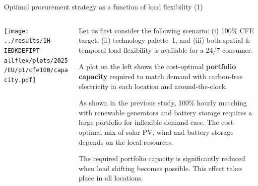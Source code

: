 \begin{frame}{Optimal procurement strategy as a function of load flexibility (1)}

  {\footnotesize
  \vspace{0.2cm}
  
  \begin{columns}[T]
  \begin{column}{9cm}
  \centering
  
  \texttt{[image: ../results/1H-IEDKDEFIPT-allflex/plots/2025/EU/p1/cfe100/capacity.pdf]}
  \end{column}
  \begin{column}{6cm}
  
  Let us first consider the following scenario:
  (i) 100\% CFE target, (ii) technology palette~1, and (iii) both spatial \& temporal load flexibility is available for a 24/7 consumer.
  
  \vspace{0.1cm}
  A plot on the left shows the cost-optimal {\bf portfolio capacity} required to match demand with carbon-free electricity in each location and around-the-clock.
  
  \vspace{0.1cm}
  As shown in the previous study, 100\% hourly matching with renewable generators and battery storage requires a large portfolio for inflexible demand case. The cost-optimal mix of solar PV, wind and battery storage depends on the local resources.

  \vspace{0.1cm}
  The required portfolio capacity \alert{is significantly reduced when load shifting becomes possible}. This effect takes place in all locations.
  \end{column}
  \end{columns}
  }
\end{frame}


